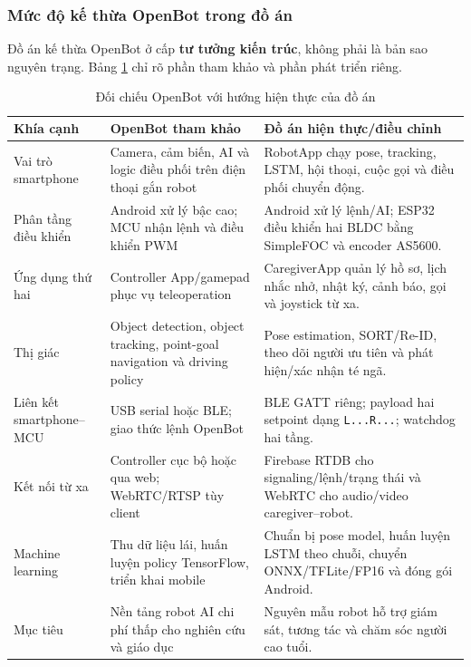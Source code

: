 \subsubsection{Mức độ kế thừa OpenBot trong đồ án}

Đồ án kế thừa OpenBot ở cấp \textbf{tư tưởng kiến trúc}, không phải là bản sao nguyên trạng. Bảng \ref{tab:openbot_inheritance} chỉ rõ phần tham khảo và phần phát triển riêng.

\begin{table}[htbp]
\centering
\caption{Đối chiếu OpenBot với hướng hiện thực của đồ án}
\label{tab:openbot_inheritance}
\small
\begin{tabularx}{\textwidth}{|p{3.0cm}|X|X|}
\hline
\textbf{Khía cạnh} & \textbf{OpenBot tham khảo} & \textbf{Đồ án hiện thực/điều chỉnh} \\
\hline
Vai trò smartphone & Camera, cảm biến, AI và logic điều phối trên điện thoại gắn robot & RobotApp chạy pose, tracking, LSTM, hội thoại, cuộc gọi và điều phối chuyển động. \\
\hline
Phân tầng điều khiển & Android xử lý bậc cao; MCU nhận lệnh và điều khiển PWM & Android xử lý lệnh/AI; ESP32 điều khiển hai BLDC bằng SimpleFOC và encoder AS5600. \\
\hline
Ứng dụng thứ hai & Controller App/gamepad phục vụ teleoperation & CaregiverApp quản lý hồ sơ, lịch nhắc nhở, nhật ký, cảnh báo, gọi và joystick từ xa. \\
\hline
Thị giác & Object detection, object tracking, point-goal navigation và driving policy & Pose estimation, SORT/Re-ID, theo dõi người ưu tiên và phát hiện/xác nhận té ngã. \\
\hline
Liên kết smartphone--MCU & USB serial hoặc BLE; giao thức lệnh OpenBot & BLE GATT riêng; payload hai setpoint dạng \texttt{L...R...}; watchdog hai tầng. \\
\hline
Kết nối từ xa & Controller cục bộ hoặc qua web; WebRTC/RTSP tùy client & Firebase RTDB cho signaling/lệnh/trạng thái và WebRTC cho audio/video caregiver--robot. \\
\hline
Machine learning & Thu dữ liệu lái, huấn luyện policy TensorFlow, triển khai mobile & Chuẩn bị pose model, huấn luyện LSTM theo chuỗi, chuyển ONNX/TFLite/FP16 và đóng gói Android. \\
\hline
Mục tiêu & Nền tảng robot AI chi phí thấp cho nghiên cứu và giáo dục & Nguyên mẫu robot hỗ trợ giám sát, tương tác và chăm sóc người cao tuổi. \\
\hline
\end{tabularx}
\end{table}


